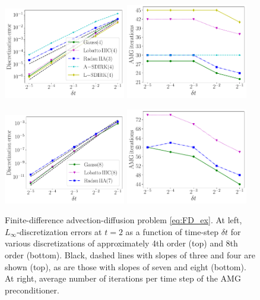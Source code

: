 \documentclass[review]{siamart}
\begin{document}
\begin{figure}[!htb]
\centerline{
\includegraphics[width = 0.475\textwidth]{figures/FD_ex/errors_iters_14_34_23_-14_4_d2_ex1.pdf}
\quad
\includegraphics[width = 0.475\textwidth]{figures/FD_ex/amg_iters_14_34_23_-14_4_d2_ex1.pdf}
}
\centerline{
\includegraphics[width = 0.475\textwidth]{figures/FD_ex/errors_iters_18_38_27_d2_ex1.pdf}
\quad
\includegraphics[width = 0.475\textwidth]{figures/FD_ex/amg_iters_18_38_27_d2_ex1.pdf}
}
\caption{Finite-difference advection-diffusion problem \eqref{eq:FD_ex}. At left, $L_{\infty}$-discretization errors at $t = 2$ as a function of time-step $\delta t$ for various discretizations of approximately 4th order (top) and 8th order (bottom). Black, dashed lines with slopes of three and four are shown (top), as are those with slopes of seven and eight (bottom). At right, average number of iterations per time step of the AMG preconditioner.
\label{fig:FD_ex}
}
\end{figure}
\end{document}
